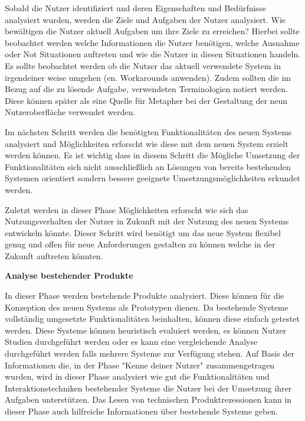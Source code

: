 Sobald die Nutzer identifiziert und deren Eigenschaften und Bedürfnisse analysiert wurden, werden die Ziele und Aufgaben der Nutzer analysiert. Wie bewältigen die Nutzer aktuell Aufgaben um 
ihre Ziele zu erreichen? Hierbei sollte beobachtet werden welche Informationen die Nutzer benötigen, welche Ausnahme oder Not Situationen  auftreten und wie die Nutzer in diesen Situationen handeln. 
Es sollte beobachtet werden ob die Nutzer das aktuell verwendete System in irgendeiner weise umgehen (en. Workarounds anwenden). Zudem sollten die im Bezug auf die zu lösende Aufgabe, verwendeten 
Terminologien notiert werden. Diese können später als eine Quelle für Metapher bei der Gestaltung der neun Nutzeroberfläche verwendet werden. 

Im nächsten Schritt werden die benötigten Funktionalitäten des neuen Systems analysiert und Möglichkeiten erforscht wie diese mit dem neuen System erzielt werden können. 
Es ist wichtig dass in diesem Schritt die Mögliche Umsetzung der Funktionalitäten sich nicht ausschließlich an Lösungen von bereits bestehenden Systemen orientiert sondern 
bessere geeignete Umsetzungsmöglichkeiten erkundet werden.

Zuletzt werden in dieser Phase Möglichkeiten erforscht wie sich das Nutzungsverhalten der Nutzer in Zukunft mit der Nutzung des neuen Systems entwickeln könnte. Dieser Schritt wird  
benötigt um das neue System flexibel genug und offen für neue Anforderungen  gestalten zu können welche in der Zukunft auftreten könnten. %

\vspace{5mm}
\textbf{Analyse bestehender Produkte} 
 
In dieser Phase werden bestehende Produkte analysiert. Diese können für die Konzeption des neuen Systems als Prototypen dienen. Da bestehende Systeme vollständig 
umgesetzte Funktionalitäten beinhalten, können diese einfach getestet werden.    
Diese Systeme können heuristisch evaluiert werden, es können Nutzer Studien durchgeführt werden oder es kann eine vergleichende Analyse durchgeführt werden falls mehrere Systeme zur 
Verfügung stehen. Auf Basis der Informationen die, in der Phase "Kenne deiner Nutzer" zusammengetragen wurden, wird in dieser Phase analysiert wie gut die  Funktionalitäten und Interaktionstechniken 
bestehender Systeme die Nutzer bei der Umsetzung ihrer Aufgaben unterstützen. Das Lesen von technischen Produktrezessionen kann in dieser Phase auch hilfreiche Informationen über bestehende Systeme geben. 

